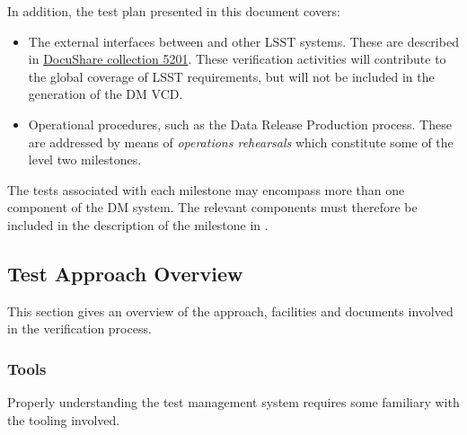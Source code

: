 In addition, the test plan presented in this document covers:

\begin{itemize}

\item{The external interfaces between \product{} and other LSST systems.
These are described in \href{https://ls.st/Collection-5201}{DocuShare collection 5201}.
These verification activities will contribute to the global coverage of LSST requirements, but will not be included in the generation of the DM VCD.}

\item{Operational procedures, such as the Data Release Production process.
These are addressed by means of \textit{operations rehearsals} which constitute some of the level two milestones.}

\end{itemize}



The tests associated with each milestone may encompass more than one component of the DM system.
The relevant components must therefore be included in the description of the milestone in .

\subsection{Test Approach Overview}\label{sect:tsform}

This section gives an overview of the approach, facilities and documents involved in the verification process.

\subsubsection{Tools}

Properly understanding the test management system requires some familiary with the tooling involved.

